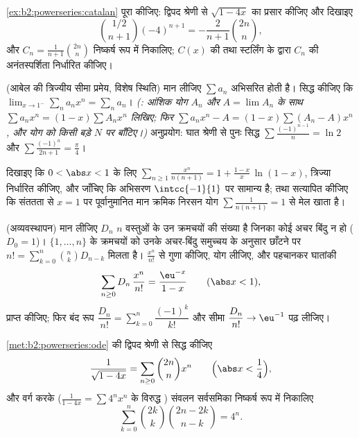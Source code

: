 \begin{exercise}[$\star\star\star$]\label{exo:b2:powerseries:8}
\cref{ex:b2:powerseries:catalan} पूरा कीजिए: द्विपद श्रेणी से $\sqrt{1 - 4x}$ का प्रसार कीजिए और दिखाइए
\[
\binom{1/2}{n+1}(-4)^{n+1} = -\frac{2}{n+1}\binom{2n}{n},
\]
और $C_n = \frac{1}{n+1}\binom{2n}{n}$ निष्कर्ष रूप में निकालिए; $C(x)$ की  तथा स्टर्लिंग के
द्वारा $C_n$ की अनंतस्पर्शिता निर्धारित कीजिए।
\end{exercise}

\begin{exercise}[$\star\star\star$]\label{exo:b2:powerseries:9}
(आबेल की त्रिज्यीय सीमा प्रमेय, विशेष स्थिति) मान लीजिए $\sum a_n$ अभिसरित होती
है। सिद्ध कीजिए कि $\lim_{x \to 1^-} \sum_{n} a_n x^n = \sum_n
a_n$। \emph{(: आंशिक योग $A_n$ और $A =
\lim A_n$ के साथ $\sum a_nx^n = (1 - x)\sum A_n x^n$
लिखिए; फिर $\sum
a_nx^n - A = (1-x)\sum (A_n - A)x^n$, और योग को किसी बड़े $N$ पर बाँटिए।)} अनुप्रयोग: घात
श्रेणी से पुनः सिद्ध $\sum \frac{(-1)^{n-1}}{n} = \ln 2$ और $\sum
\frac{(-1)^n}{2n+1} = \frac\pi4$।
\end{exercise}

\begin{exercise}[$\star$]\label{exo:b2:powerseries:10}
दिखाइए कि $0 < \abs x < 1$ के लिए $\displaystyle\sum_{n\geq1}\frac{x^n}{n(n+1)} = 1 +
\frac{1-x}{x}\,\ln(1-x)$, त्रिज्या निर्धारित कीजिए, और जाँचिए कि अभिसरण
$\intcc{-1}{1}$ पर सामान्य है; तथा सत्यापित कीजिए कि संततता से $x = 1$ पर पूर्वानुमानित
मान क्रमिक निरसन योग $\sum
\frac{1}{n(n+1)} = 1$ से मेल खाता है।
\end{exercise}

\begin{exercise}[$\star\star$]\label{exo:b2:powerseries:11}
(अव्यवस्थापन) मान लीजिए $D_n$ $n$ वस्तुओं के उन क्रमचयों की संख्या है
जिनका कोई अचर बिंदु न हो ($D_0 = 1$)। $\{1, \dots, n\}$ के क्रमचयों को उनके अचर-बिंदु
समुच्चय के अनुसार छाँटने पर $n! = \sum_{k=0}^{n}\binom nk D_{n-k}$ मिलता है। $\frac{x^n}{n!}$ से गुणा कीजिए, योग लीजिए,
और  पहचानकर घातांकी 
\[
\sum_{n\geq0} D_n\,\frac{x^n}{n!} = \frac{\eu^{-x}}{1-x}
\qquad (\abs x < 1),
\]
प्राप्त कीजिए; फिर बंद रूप $\dfrac{D_n}{n!} =
\sum_{k=0}^{n}\dfrac{(-1)^k}{k!}$ और सीमा $\dfrac{D_n}{n!}
\to \eu^{-1}$ पढ़ लीजिए।
\end{exercise}

\begin{exercise}[$\star\star\star$]\label{exo:b2:powerseries:12}
\cref{met:b2:powerseries:ode} की द्विपद श्रेणी से सिद्ध कीजिए
\[
\frac{1}{\sqrt{1 - 4x}} = \sum_{n\geq0}\binom{2n}{n}x^n
\qquad \Bigl(\abs x < \frac14\Bigr),
\]
और वर्ग करके ($\frac{1}{1-4x} = \sum 4^nx^n$ के विरुद्ध ) संवलन सर्वसमिका निष्कर्ष रूप
में निकालिए
\[
\sum_{k=0}^{n}\binom{2k}{k}\binom{2n-2k}{n-k} = 4^n .
\]
\end{exercise}

